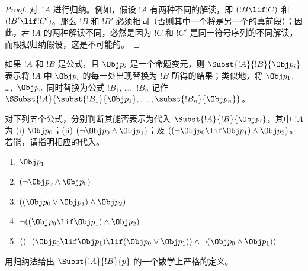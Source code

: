 \documentclass[../../../include/open-logic-section]{subfiles}
\begin{document}
\begin{proof}
对~$!A$ 进行归纳。例如，假设 $!A$ 有两种不同的解读，即 $(!B \lif !C)$ 和 $(!B' \lif !C')$。那么 $!B$ 和 $!B'$ 必须相同（否则其中一个将是另一个的真前段）；因此，若 $!A$ 的两种解读不同，必然是因为 $!C$ 和 $!C'$ 是同一符号序列的不同解读，而根据归纳假设，这是不可能的。
\end{proof}

\begin{defn}[一致代入]
如果 $!A$ 和 $!B$ 是公式，且 $\Obj p_i$ 是一个命题变元，则 $\Subst{!A}{!B}{\Obj p_i}$ 表示将 $!A$ 中 $\Obj p_i$ 的每一处出现替换为 $!B$ 所得的结果；类似地，将 $\Obj p_1$, \dots,~$\Obj p_n$ 同时替换为公式 $!B_1$, \dots,~$!B_n$ 记作 $\SSubst{!A}{\subst{!B_1}{\Obj p_1},\dots,\subst{!B_n}{\Obj p_n}}$。
\end{defn}

\begin{prob} 对下列五个公式，分别判断其能否表示为代入 \( \Subst{!A}{!B}{\Obj p_i} \)，其中 \( !A \) 为 (i) \( \Obj p_0 \)；(ii) \( ( \lnot \Obj p_0 \land \Obj
 p_1) \)；及 \( ( ( \lnot \Obj p_0 \lif \Obj p_1 ) \land \Obj
 p_2 ) \)。若能，请指明相应的代入。
  \begin{enumerate}
    \item \( \Obj p_1 \)
    \item \( ( \lnot \Obj p_0 \land \Obj p_0 ) \)
    \item \( ( ( \Obj p_0 \lor \Obj p_1 ) \land \Obj p_2 )  \)
    \item \( \lnot ( ( \Obj p_0 \lif \Obj p_1 ) \land \Obj p_2 ) \)
    \item \( (( \lnot ( \Obj p_0 \lif \Obj p_1 ) \lif ( \Obj p_0 \lor \Obj p_1 )) \land \lnot ( \Obj p_0 \land \Obj p_1 )) \)
  \end{enumerate}
\end{prob}

\begin{prob}
用归纳法给出 $\Subst{!A}{!B}{p}$ 的一个数学上严格的定义。
\end{prob}
\end{document}
